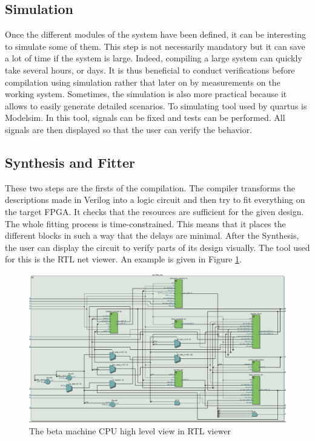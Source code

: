 
\subsection{Simulation}

Once the different modules of the system have been defined, it can be interesting to simulate some 
of them. This step is not necessarily mandatory but it can save a lot of time if the system is large. 
Indeed, compiling a large system can quickly take several hours, or days.  It is thus beneficial to
conduct verifications before compilation using simulation rather that later on by measurements on the working 
system. 
Sometimes, the simulation is also more practical because it allows to easily generate detailed 
scenarios. To simulating tool used by quartus is Modelsim. In this tool, signals can be fixed 
and tests can be performed. All signals are then displayed so that the user can verify the 
behavior.

\subsection{Synthesis and Fitter}

These two steps are the firsts of the compilation. The compiler transforms the descriptions made
 in Verilog into a logic circuit and then try to fit everything on the target FPGA. It checks that 
 the resources are sufficient for the given design. The whole fitting process is 
 time-constrained. This means that it places the different blocks in such a way that the delays 
 are minimal. After the Synthesis, the user can display the circuit to verify parts of its design
 visually. The tool used for this is the RTL net viewer. An example is given in Figure 
 \ref{fig:tools/rtl}.

 \begin{figure}[H]
    \centering
    \includegraphics[width=\linewidth]{Chapter2-FPGA_Flow/res/rtl.PNG}
    \caption{The beta machine CPU high level view in RTL viewer}
    \label{fig:tools/rtl}
\end{figure}

